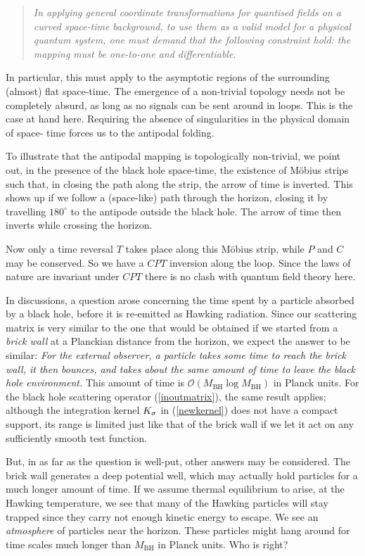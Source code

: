 \documentclass[12pt]{article}
\def\eqn#1{(\ref{#1})}
\def\OO{{\mathcal O}} 	\def\DD{{\mathcal D}}	     \def\ZZ{\mathbb{Z}}
\def\BH{{\mathrm{BH}}}\def\Pl{{\mathrm{Pl}}}\def\inn{{\mathrm{in}}} \def\outt{{\mathrm{out}}}
\begin{document}
\begin{quote} \emph{In  applying general coordinate transformations for quantised fields on a curved space-time background, to use them as a valid model for a physical quantum system, one must demand that the following constraint hold: the mapping must be one-to-one and differentiable.} \end{quote}
In particular, this must apply to the asymptotic regions of the surrounding (almost) flat space-time.
The emergence of a non-trivial topology needs not be completely absurd, as long as no signals can be sent around in loops. This is the case at hand here. Requiring the absence of singularities in the physical domain of space- time forces us to the antipodal folding.

To illustrate that the antipodal mapping is topologically non-trivial, we point out, in the presence of the black hole space-time,  the existence of M\"obius strips such that, in closing the path along the strip, the arrow of time is inverted. This shows up if we follow a (space-like) path through the horizon, closing it by travelling \(180^\circ\) to the antipode outside the black hole. The arrow of time then inverts while crossing the horizon.

Now only a time reversal \(T\) takes place along this M\"obius strip, while \(P\) and \(C\) may be conserved. So we have a \(CPT\) inversion along the loop. Since the laws of nature are invariant under \(CPT\) there is no clash with quantum field theory here.

In discussions, a question arose concerning the time spent by a particle absorbed by a black hole, before it is re-emitted as Hawking radiation. Since our scattering matrix is very similar to the one that would be obtained if we started from a \emph{brick wall} at a Planckian distance from the horizon, we expect the answer to be similar: \emph{For the external observer, a particle takes some time to reach the brick wall, it then bounces, and takes about the same amount of time to leave the black hole environment.} This amount of time is \(\OO(M_\BH\log M_\BH)\) in Planck units. For the black hole scattering operator \eqn{inoutmatrix}, the same result applies; although the integration kernel \(K_\sigma\) in \eqn{newkernel} does not have a compact support, its range is limited just like that of the brick wall if we let it act on any sufficiently smooth test function.

But, in as far as the question is well-put, other answers may be considered. The brick wall generates a deep potential well, which may actually hold particles for a much longer amount of time. If we assume thermal equilibrium to arise, at the Hawking temperature, we see that many of the Hawking particles will stay trapped since they carry not enough kinetic energy to escape. We see an \emph{atmosphere} of particles near the horizon. These particles might hang around for time scales much longer than \(M_\BH\) in Planck units. Who is right?
\end{document}
